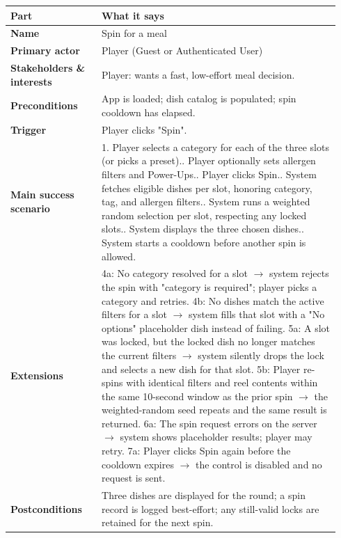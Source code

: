 \documentclass[11pt,twocolumn]{article}
\newcommand{\ucheader}{%
\textbf{Part} & \textbf{What it says} \\
\hline
\endhead
\hline
\endfoot
}
\begin{document}
{\footnotesize
\begin{longtable}{@{}p{0.26\linewidth}p{0.68\linewidth}@{}}
\hline
\ucheader
\textbf{Name} & Spin for a meal \\
\hline
\textbf{Primary actor} & Player (Guest or Authenticated User) \\
\hline
\textbf{Stakeholders \& interests} & Player: wants a fast, low-effort meal decision. \\
\hline
\textbf{Preconditions} & App is loaded; dish catalog is populated; spin cooldown has elapsed. \\
\hline
\textbf{Trigger} & Player clicks "Spin". \\
\hline
\textbf{Main success scenario} & 1. Player selects a category for each of the three slots (or picks a preset).\newline
2. Player optionally sets allergen filters and Power-Ups.\newline
3. Player clicks Spin.\newline
4. System fetches eligible dishes per slot, honoring category, tag, and allergen filters.\newline
5. System runs a weighted random selection per slot, respecting any locked slots.\newline
6. System displays the three chosen dishes.\newline
7. System starts a cooldown before another spin is allowed. \\
\hline
\textbf{Extensions} & 4a: No category resolved for a slot $\rightarrow$ system rejects the spin with "category is required"; player picks a category and retries.\newline
4b: No dishes match the active filters for a slot $\rightarrow$ system fills that slot with a "No options" placeholder dish instead of failing.\newline
5a: A slot was locked, but the locked dish no longer matches the current filters $\rightarrow$ system silently drops the lock and selects a new dish for that slot.\newline
5b: Player re-spins with identical filters and reel contents within the same 10-second window as the prior spin $\rightarrow$ the weighted-random seed repeats and the same result is returned.\newline
6a: The spin request errors on the server $\rightarrow$ system shows placeholder results; player may retry.\newline
7a: Player clicks Spin again before the cooldown expires $\rightarrow$ the control is disabled and no request is sent. \\
\hline
\textbf{Postconditions} & Three dishes are displayed for the round; a spin record is logged best-effort; any still-valid locks are retained for the next spin. \\
\hline
\end{longtable}
}
\end{document}
